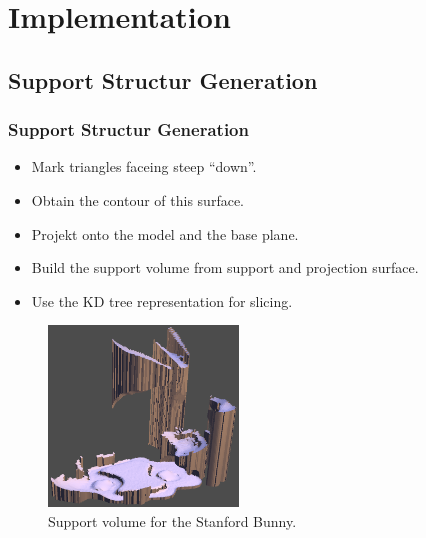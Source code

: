 \documentclass{beamer}
\begin{document}
\section{Implementation}

\subsection{Support Structur Generation}
\begin{frame}
\frametitle{Support Structur Generation} 
 \begin{itemize}
  \item Mark triangles faceing steep ``down''.
  \item Obtain the contour of this surface.
  \item Projekt onto the model and the base plane.
  \item Build the support volume from support and projection surface.
  \item Use the KD tree representation for slicing.
 \end{itemize}
\begin{figure}
\centering
\includegraphics[width=0.45\textwidth]{support_mesh}
\caption{Support volume for the Stanford Bunny.}
\end{figure}
\end{frame}
\end{document}
